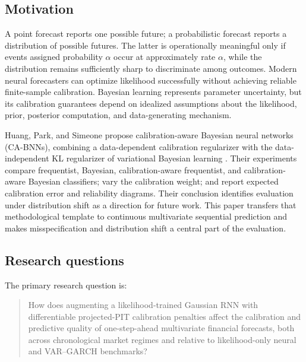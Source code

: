 \documentclass[11pt]{article}
\begin{document}
\subsection{Motivation}

A point forecast reports one possible future; a probabilistic forecast reports a
distribution of possible futures. The latter is operationally meaningful only if
events assigned probability $\alpha$ occur at approximately rate $\alpha$, while
the distribution remains sufficiently sharp to discriminate among outcomes.
Modern neural forecasters can optimize likelihood successfully without achieving
reliable finite-sample calibration. Bayesian learning represents parameter
uncertainty, but its calibration guarantees depend on idealized assumptions about
the likelihood, prior, posterior computation, and data-generating mechanism.

Huang, Park, and Simeone propose calibration-aware Bayesian neural networks
(CA-BNNs), combining a data-dependent calibration regularizer with the
data-independent KL regularizer of variational Bayesian learning
\cite{huang2024cabl}. Their experiments compare frequentist, Bayesian,
calibration-aware frequentist, and calibration-aware Bayesian classifiers; vary
the calibration weight; and report expected calibration error and reliability
diagrams. Their conclusion identifies evaluation under distribution shift as a
direction for future work. This paper transfers that methodological template to
continuous multivariate sequential prediction and makes misspecification and
distribution shift a central part of the evaluation.

\subsection{Research questions}

The primary research question is:

\begin{quote}
How does augmenting a likelihood-trained Gaussian RNN with differentiable
projected-PIT calibration penalties affect the calibration and predictive
quality of one-step-ahead multivariate financial forecasts, both across
chronological market regimes and relative to likelihood-only neural and
VAR--GARCH benchmarks?
\end{quote}
\end{document}
